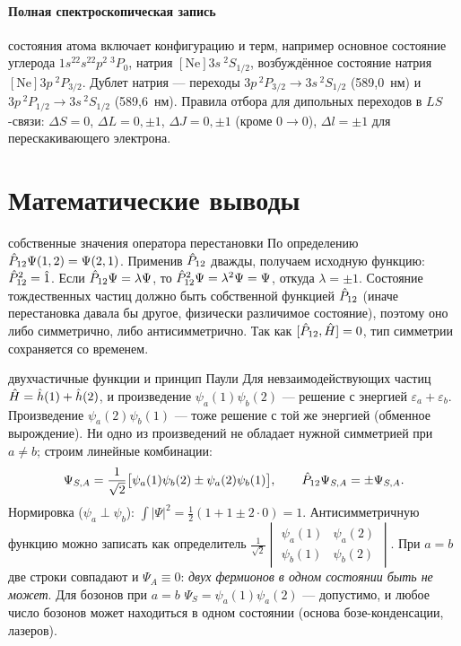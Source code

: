 \paragraph{Полная спектроскопическая запись} состояния атома включает конфигурацию и терм, например
основное состояние углерода $1s^22s^22p^2\ ^3P_0$, натрия $[\mathrm{Ne}]3s\ ^2S_{1/2}$, возбуждённое состояние
натрия $[\mathrm{Ne}]3p\ ^2P_{3/2}$. Дублет натрия — переходы $3p\,^2P_{3/2}\to3s\,^2S_{1/2}$ (589,0~нм) и
$3p\,^2P_{1/2}\to3s\,^2S_{1/2}$ (589,6~нм). Правила отбора для дипольных переходов в $LS$-связи: $\Delta S=0$,
$\Delta L=0,\pm1$, $\Delta J=0,\pm1$ (кроме $0\to0$), $\Delta l=\pm1$ для перескакивающего электрона.

\section{Математические выводы}

\begin{derivation}[label=der:13:perm]{собственные значения оператора перестановки}
По определению $\hat{P}_{12}\Psi(1,2)=\Psi(2,1)$. Применив $\hat{P}_{12}$ дважды, получаем исходную функцию:
$\hat{P}_{12}^2=\hat{1}$. Если $\hat{P}_{12}\Psi=\lambda\Psi$, то $\hat{P}_{12}^2\Psi=\lambda^2\Psi=\Psi$, откуда $\lambda=\pm1$. Состояние
тождественных частиц должно быть собственной функцией $\hat{P}_{12}$ (иначе перестановка давала бы другое,
физически различимое состояние), поэтому оно либо симметрично, либо антисимметрично. Так как
$[\hat{P}_{12},\hat{H}]=0$, тип симметрии сохраняется со временем.
\end{derivation}

\begin{derivation}[label=der:13:slater]{двухчастичные функции и принцип Паули}
Для невзаимодействующих частиц $\hat{H}=\hat{h}(1)+\hat{h}(2)$, и произведение $\psi_a(1)\psi_b(2)$ — решение с энергией
$\varepsilon_a+\varepsilon_b$. Произведение $\psi_a(2)\psi_b(1)$ — тоже решение с той же энергией (обменное вырождение).
Ни одно из произведений не обладает нужной симметрией при $a\neq b$; строим линейные комбинации:
\[
  \Psi_{S,A}=\frac{1}{\sqrt2}\bigl[\psi_a(1)\psi_b(2)\pm\psi_a(2)\psi_b(1)\bigr],\qquad
  \hat{P}_{12}\Psi_{S,A}=\pm\Psi_{S,A}.
\]
Нормировка ($\psi_a\perp\psi_b$): $\int|\Psi|^2=\frac12(1+1\pm2\cdot0)=1$. Антисимметричную функцию можно записать как
определитель $\frac{1}{\sqrt2}\begin{vmatrix}\psi_a(1)&\psi_a(2)\\\psi_b(1)&\psi_b(2)\end{vmatrix}$. При $a=b$ две строки совпадают и $\Psi_A\equiv0$:
\emph{двух фермионов в одном состоянии быть не может}. Для бозонов при $a=b$ $\Psi_S=\psi_a(1)\psi_a(2)$ —
допустимо, и любое число бозонов может находиться в одном состоянии (основа бозе-конденсации, лазеров).
\end{derivation}

